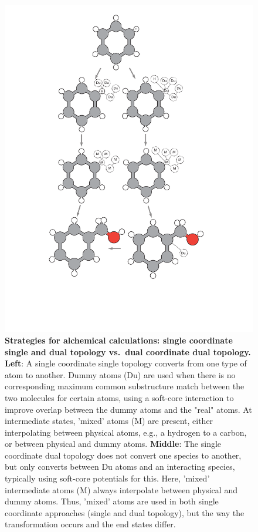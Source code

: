 \documentclass[9pt,bestpractices,pubversion]{livecoms}
\begin{document}
\begin{figure}
    \includegraphics[width=0.95\columnwidth]{figures/fig3_topol/Figure.pdf}
    \caption{\textbf{Strategies for alchemical calculations: single coordinate single and dual topology vs.\ dual coordinate dual topology.} \textbf{Left}: A single coordinate single topology converts from one type of atom to another. Dummy atoms (Du) are used when there is no corresponding maximum common substructure match between the two molecules for certain atoms, using a soft-core interaction to improve overlap between the dummy atoms and the "real" atoms. At intermediate states, 'mixed' atoms (M) are present, either interpolating between physical atoms, e.g., a hydrogen to a carbon, or between physical and dummy atoms.  \textbf{Middle}: The single coordinate dual topology does not convert one species to another, but only converts between Du atoms and an interacting species, typically using soft-core potentials for this. Here, 'mixed' intermediate atoms (M) always interpolate between physical and dummy atoms. Thus, 'mixed' atoms are used in both single coordinate approaches (single and dual topology), but the way the transformation occurs and the end states differ.
}
\end{figure}
\end{document}
